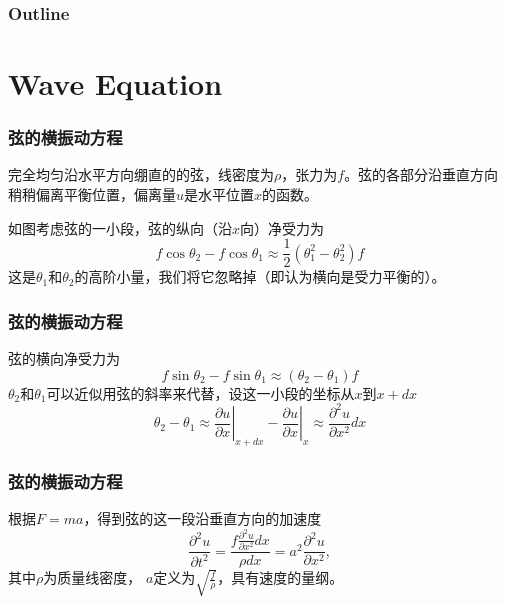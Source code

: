 \documentclass[CJK]{beamer}
\date{}
\begin{document}
  \bch
{}

\begin{frame}
  \frametitle{Outline}  
  \tableofcontents
\end{frame}


\section{Wave Equation}

\begin{frame}
\frametitle{弦的横振动方程}

完全均匀沿水平方向绷直的的弦，线密度为$\rho$，张力为$f$。弦的各部分沿垂直方向稍稍偏离平衡位置，偏离量$u$是水平位置$x$的函数。


如图考虑弦的一小段，弦的纵向（沿$x$向）净受力为 $$ f \cos\theta_2 - f\cos\theta_1 \approx \frac{1}{2}\left(\theta_1^2-\theta_2^2\right) f $$
这是$\theta_1$和$\theta_2$的高阶小量，我们将它忽略掉（即认为横向是受力平衡的）。


\end{frame}



\begin{frame}
\frametitle{弦的横振动方程}


弦的横向净受力为 $$ f \sin\theta_2 - f\sin\theta_1 \approx \left(\theta_2-\theta_1\right) f $$
$\theta_2$和$\theta_1$可以近似用弦的斜率来代替，设这一小段的坐标从$x$到$x+dx$
$$\theta_2-\theta_1 \approx \left.\frac{\partial u}{\partial x}\right\vert_{x+dx}-\left.\frac{\partial u}{\partial x}\right\vert_{x} \approx \frac{\partial^2u}{\partial x^2} dx $$


\end{frame}


\begin{frame}
\frametitle{弦的横振动方程}

根据$F=ma$，得到弦的这一段沿垂直方向的加速度
$$\frac{\partial ^2u}{\partial t^2} = \frac{f\frac{\partial^2u}{\partial x^2} dx}{\rho dx} = a^2 \frac{\partial^2u}{\partial x^2} ,$$
其中$\rho$为质量线密度， $a$定义为$\sqrt{\frac{f}{\rho}}$，具有速度的量纲。


\end{frame}
\end{document}
